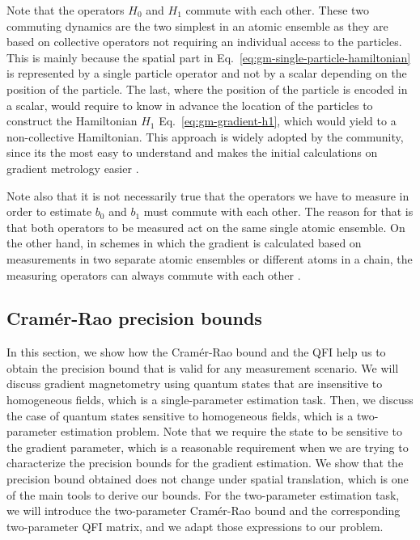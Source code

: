 Note that the operators $H_{0}$ and $H_{1}$ commute with each other.
These two commuting dynamics are the two simplest in an atomic ensemble as they are based on collective operators not requiring an individual access to the particles.
This is mainly because the spatial part in Eq.~\eqref{eq:gm-single-particle-hamiltonian} is represented by a single particle operator and not by a scalar depending on the position of the particle.
The last, where the position of the particle is encoded in a scalar, would require to know in advance the location of the particles to construct the Hamiltonian $H_1$ Eq.~\eqref{eq:gm-gradient-h1}, which would yield to a non-collective Hamiltonian.
This approach is widely adopted by the community, since its the most easy to understand and makes the initial calculations on gradient metrology easier \cite{Urizar-Lanz2015, Altenburg2016, Ng2011}.

Note also that it is not necessarily true that the operators we have to measure in order to estimate $b_0$ and $b_1$ must commute with each other.
The reason for that is that both operators to be measured act on the same single atomic ensemble.
On the other hand, in schemes in which the gradient is calculated based on measurements in two separate atomic ensembles or different atoms in a chain, the measuring operators can always commute with each other \cite{Wasilewski2010,Eckert2006,Zhang2014}.

\subsection{Cram\'er-Rao precision bounds}
\label{sec:gm-cramer-rao-bounds}

In this section, we show how the Cram\'er-Rao bound and the QFI help us to obtain the precision bound that is valid for any measurement scenario.
We will discuss gradient magnetometry using quantum states that are insensitive to homogeneous fields, which is a single-parameter estimation task.
Then, we discuss the case of quantum states sensitive to homogeneous fields, which is a two-parameter estimation problem.
Note that we require the state to be sensitive to the gradient parameter, which is a reasonable requirement when we are trying to characterize the precision bounds for the gradient estimation.
We show that the precision bound obtained does not change under spatial translation, which is one of the main tools to derive our bounds.
For the two-parameter estimation task, we will introduce the two-parameter Cram\'er-Rao bound and the corresponding two-parameter QFI matrix, and we adapt those expressions to our problem.


